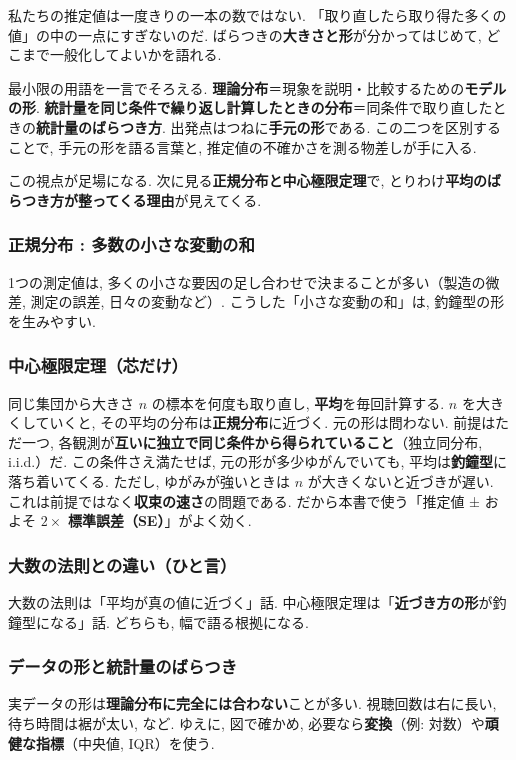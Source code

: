     私たちの推定値は一度きりの一本の数ではない.
    「取り直したら取り得た多くの値」の中の一点にすぎないのだ.
    ばらつきの\textbf{大きさと形}が分かってはじめて, どこまで一般化してよいかを語れる.

    \medskip
    \noindent 最小限の用語を一言でそろえる.
    \textbf{理論分布}＝現象を説明・比較するための\textbf{モデルの形}.
    \textbf{統計量を同じ条件で繰り返し計算したときの分布}＝同条件で取り直したときの\textbf{統計量のばらつき方}.
    出発点はつねに\textbf{手元の形}である.
    この二つを区別することで, 手元の形を語る言葉と, 推定値の不確かさを測る物差しが手に入る.

    この視点が足場になる.
    次に見る\textbf{正規分布と中心極限定理}で, とりわけ\textbf{平均のばらつき方が整ってくる理由}が見えてくる.

    \subsubsection*{正規分布 : 多数の小さな変動の和}
      1つの測定値は, 多くの小さな要因の足し合わせで決まることが多い（製造の微差, 測定の誤差, 日々の変動など）.
      こうした「小さな変動の和」は, 釣鐘型の形を生みやすい.

    \subsubsection*{中心極限定理（芯だけ）}
      同じ集団から大きさ $n$ の標本を何度も取り直し, \textbf{平均}を毎回計算する.
      $n$ を大きくしていくと, その平均の分布は\textbf{正規分布}に近づく.
      元の形は問わない.
      前提はただ一つ, 各観測が\textbf{互いに独立で同じ条件から得られていること}（独立同分布, i.i.d.）だ.
      この条件さえ満たせば, 元の形が多少ゆがんでいても, 平均は\textbf{釣鐘型}に落ち着いてくる.
      ただし, ゆがみが強いときは $n$ が大きくないと近づきが遅い. これは前提ではなく\textbf{収束の速さ}の問題である.
      だから本書で使う「推定値 ± およそ $2\times$ \textbf{標準誤差（SE）}」がよく効く.

    \subsubsection*{大数の法則との違い（ひと言）}
      大数の法則は「平均が真の値に近づく」話.
      中心極限定理は「\textbf{近づき方の形}が釣鐘型になる」話. どちらも, 幅で語る根拠になる.

    \subsubsection*{データの形と統計量のばらつき}
      実データの形は\textbf{理論分布に完全には合わない}ことが多い. 視聴回数は右に長い, 待ち時間は裾が太い, など.
      ゆえに, 図で確かめ, 必要なら\textbf{変換}（例: 対数）や\textbf{頑健な指標}（中央値, IQR）を使う.

